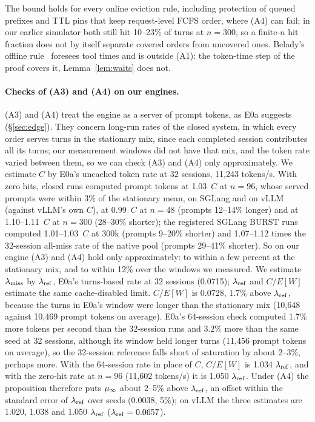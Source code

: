 The bound holds for every online eviction rule, including protection of queued prefixes and TTL pins that keep request-level FCFS order, where (A4) can fail; in our earlier simulator both still hit 10--23\% of turns at $n=300$, so a finite-$n$ hit fraction does not by itself separate covered orders from uncovered ones. Belady's offline rule~\citep{belady1966study} foresees tool times and is outside (A1): the token-time step of the proof covers it, Lemma~\ref{lem:waits} does not.

\paragraph{Checks of (A3) and (A4) on our engines.} (A3) and (A4) treat the engine as a server of prompt tokens, as E0a suggests (\S\ref{sec:edge}). They concern long-run rates of the closed system, in which every order serves turns in the stationary mix, since each completed session contributes all its turns; our measurement windows did not have that mix, and the token rate varied between them, so we can check (A3) and (A4) only approximately. We estimate $C$ by E0a's uncached token rate at 32 sessions, 11,243 tokens/s. With zero hits, closed runs computed prompt tokens at 1.03~$C$ at $n=96$, whose served prompts were within 3\% of the stationary mean, on SGLang and on vLLM (against vLLM's own $C$), at 0.99~$C$ at $n=48$ (prompts 12--14\% longer) and at 1.10--1.11~$C$ at $n=300$ (28--30\% shorter); the registered SGLang BURST runs computed 1.01--1.03~$C$ at 300k (prompts 9--20\% shorter) and 1.07--1.12 times the 32-session all-miss rate of the native pool (prompts 29--41\% shorter). So on our engine (A3) and (A4) hold only approximately: to within a few percent at the stationary mix, and to within 12\% over the windows we measured. We estimate $\lambda_{\mathrm{miss}}$ by $\lambda_{\mathrm{ref}}$, E0a's turns-based rate at 32 sessions (0.0715\sps); $\lambda_{\mathrm{ref}}$ and $C/E[W]$ estimate the same cache-disabled limit. $C/E[W]$ is 0.0728\sps, 1.7\% above $\lambda_{\mathrm{ref}}$, because the turns in E0a's window were longer than the stationary mix (10,648 against 10,469 prompt tokens on average). E0a's 64-session check computed 1.7\% more tokens per second than the 32-session runs and 3.2\% more than the same seed at 32 sessions, although its window held longer turns (11,456 prompt tokens on average), so the 32-session reference falls short of saturation by about 2--3\%, perhaps more. With the 64-session rate in place of $C$, $C/E[W]$ is 1.034 $\lambda_{\mathrm{ref}}$, and with the zero-hit rate at $n=96$ (11,602 tokens/s) it is 1.050 $\lambda_{\mathrm{ref}}$. Under (A4) the proposition therefore puts $\mu_{\infty}$ about 2--5\% above $\lambda_{\mathrm{ref}}$, an offset within the standard error of $\lambda_{\mathrm{ref}}$ over seeds (0.0038\sps, 5\%); on vLLM the three estimates are 1.020, 1.038 and 1.050 $\lambda_{\mathrm{ref}}$ ($\lambda_{\mathrm{ref}}=0.0657$\sps).

